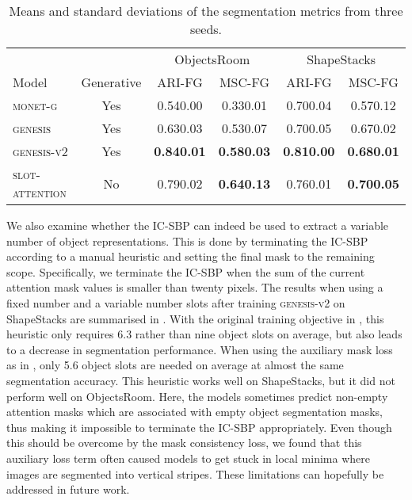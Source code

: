 \documentclass{article}
\begin{document}
\begin{table}
	\centering
    \caption{Means and standard deviations of the segmentation metrics from three seeds.}
	\begin{tabular}{lccccc}
		\toprule
		& & \multicolumn{2}{c}{ObjectsRoom} & \multicolumn{2}{c}{ShapeStacks} \\
		\cmidrule(lr){3-4} \cmidrule(lr){5-6}
		Model & Generative & ARI-FG & MSC-FG & ARI-FG & MSC-FG \\
		\midrule
		\textsc{monet-g}        & Yes & 0.540.00 & 0.330.01 & {0.700.04} & 0.570.12 \\
		\textsc{genesis}        & Yes & {0.630.03} & {0.530.07} & {0.700.05} & {0.670.02}\\
		\textsc{genesis-v2}      & Yes & \textbf{0.840.01}  & \textbf{0.580.03}  & \textbf{0.810.00} & \textbf{0.680.01}\\
        \midrule
        \textsc{slot-attention} & No & 0.790.02           & \textbf{0.640.13}  & 0.760.01          & \textbf{0.700.05}\\
		\bottomrule
	\end{tabular}
	\label{tab:gpp:seg}
\end{table}

We also examine whether the IC-SBP can indeed be used to extract a variable number of object representations.
This is done by terminating the IC-SBP according to a manual heuristic and setting the final mask to the remaining scope.
Specifically, we terminate the IC-SBP when the sum of the current attention mask values is smaller than twenty pixels.
The results when using a fixed number and a variable number slots after training \textsc{genesis-v2} on ShapeStacks are summarised in .
With the original training objective in , this heuristic only requires 6.3 rather than nine object slots on average, but also leads to a decrease in segmentation performance.
When using the auxiliary mask loss as in , only 5.6 object slots are needed on average at almost the same segmentation accuracy.
This heuristic works well on ShapeStacks, but it did not perform well on ObjectsRoom.
Here, the models sometimes predict non-empty attention masks which are associated with empty object segmentation masks, thus making it impossible to terminate the IC-SBP appropriately.
Even though this should be overcome by the mask consistency loss, we found that this auxiliary loss term often caused models to get stuck in local minima where images are segmented into vertical stripes.
These limitations can hopefully be addressed in future work.
\end{document}
